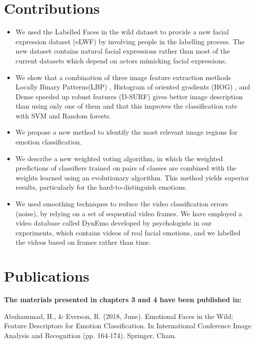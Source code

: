 \section{Contributions}
\begin{itemize}
	\item We used the Labelled Faces in the wild dataset to provide a new facial expression dataset (eLWF) by involving people in the labelling process. The new dataset contains natural facial expressions rather than most of the current datasets which depend on actors mimicking facial expressions.     
	\item We show that a combination of three image feature extraction methods Locally Binary Patterns(LBP) \citet{ojala1996comparative}, Histogram of oriented gradients (HOG) \citep{dalal2005histograms}, and Dense speeded up robust features (D-SURF)  \citep{bay2006surf,bay2008speeded} gives better image description than using only one of them and that this improves the classification rate with SVM and Random forests.  
	\item We propose a new method to identify the most relevant image regions for emotion classification.
	
	\item We describe a new weighted voting algorithm, in which the weighted predictions of classifiers trained on pairs of classes are combined with the weights learned using an evolutionary algorithm.  This method yields superior results, particularly for the hard-to-distinguish emotions.
	
	\item We used smoothing techniques to reduce the video classification errors (noise), by relying on a set of sequential video frames. We have employed a video database called DynEmo \citep{tcherkassof2013dynemo} developed by psychologists in our experiments, which contains videos of real facial emotions, and we labelled the videos based on frames rather than time. 
\end{itemize}




\section{Publications}

\textbf{The materials presented in chapters 3 and 4 have been published in:}

Abuhammad, H., \& Everson, R. (2018, June). Emotional Faces in the Wild: Feature Descriptors for Emotion Classification. In International Conference Image Analysis and Recognition (pp. 164-174). Springer, Cham. 



